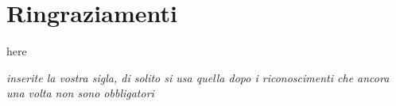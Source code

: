 \chapter*{Ringraziamenti}

here

\addvspace{5em}
\begin{flushright}
\textit{inserite la vostra sigla, di solito si usa quella dopo i riconoscimenti che ancora una volta non sono obbligatori}
\end{flushright}